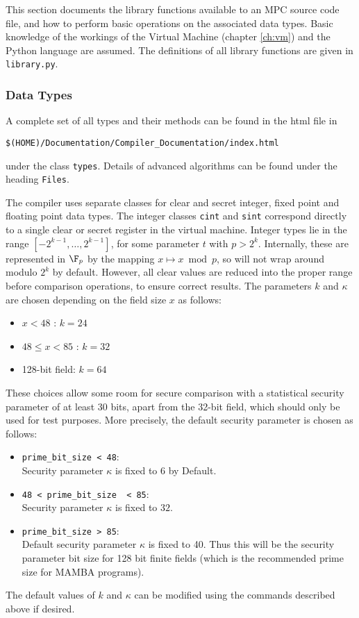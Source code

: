 This section documents the library functions available to an MPC source code
file, and how to perform basic operations on the associated data types.
Basic knowledge of the workings of the Virtual Machine
(chapter \ref{ch:vm}) and the Python language are assumed. The definitions
of all library functions are given in \verb|library.py|.

\subsubsection{Data Types}
\label{ref:datatypes}

A complete set of all types and their methods can be found in
the html file in
\begin{center}
   \verb+$(HOME)/Documentation/Compiler_Documentation/index.html+
\end{center}
under the class \verb+types+.
Details of advanced algorithms can be found under the heading
\verb+Files+.

The compiler uses separate classes for clear and secret integer, fixed point
and floating point data types. The integer classes \verb|cint| and \verb|sint|
correspond directly to a single clear or secret register in the virtual machine.
Integer types lie in the range $[-2^{k-1}, \dots, 2^{k-1}]$, for some
parameter $t$ with $p > 2^k$. Internally, these are represented in $\F_p$ by the
mapping $x \mapsto x \bmod{p}$, so will not wrap around modulo $2^k$ by default.
However, all clear values are reduced into the proper
range before comparison operations, to ensure correct results.
The parameters $k$ and $\kappa$ are chosen depending on the field size $x$ as follows:
\begin{itemize}
\item $x < 48$ : $k = 24$
\item $48 \le x < 85$ : $k = 32$
\item 128-bit field: $k = 64$
\end{itemize}
These choices allow some room for secure comparison with a statistical
security parameter of at least 30 bits, apart from the 32-bit field, which
should only be used for test purposes. More precisely, the default security parameter is chosen as follows:
\begin{itemize}
\item \verb|prime_bit_size < 48|:\\ 
Security parameter $\kappa$ is fixed to $6$ by Default.
\item \verb|48 < prime_bit_size  < 85|: \\
Security parameter $\kappa$ is fixed to $32$. 
\item \verb|prime_bit_size > 85|:\\
Default security parameter $\kappa$ is fixed to 40. Thus this will be the security parameter bit size for 128 bit finite
fields (which is the recommended prime size for MAMBA programs).
\end{itemize} 
The default values of $k$ and $\kappa$ can be modified using the commands described above if desired.

